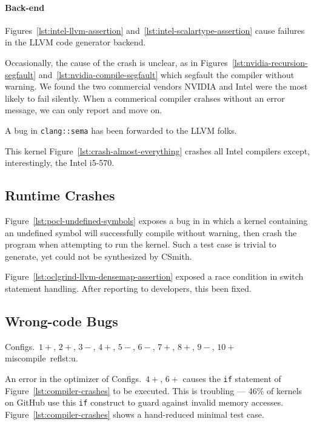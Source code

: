 \paragraph{Back-end} Figures~\ref{lst:intel-llvm-assertion} and~\ref{lst:intel-scalartype-assertion} cause failures in the LLVM code generator backend.

Occasionally, the cause of the crash is unclear, as in Figures~\ref{lst:nvidia-recursion-segfault} and~\ref{lst:nvidia-compile-segfault} which segfault the compiler without warning. We found the two commercial vendors NVIDIA and Intel were the most likely to fail silently. When a commerical compiler crahses without an error message, we can only report and move on.

A bug in \texttt{clang::sema} has been forwarded to the LLVM folks.

This kernel Figure~\ref{lst:crash-almost-everything} crashes all Intel compilers except, interestingly, the Intel i5-570.



\subsection{Runtime Crashes}

Figure~\ref{lst:pocl-undefined-symbols} exposes a bug in in which a kernel containing an undefined symbol will successfully compile without warning, then crash the program when attempting to run the kernel. Such a test case is trivial to generate, yet could not be synthesized by CSmith.

Figure~\ref{lst:oclgrind-llvm-densemap-assertion} exposed a race condition in switch statement handling. After reporting to developers, this been fixed.



\subsection{Wrong-code Bugs}

Configs.\ $1+$, $2+$, $3-$, $4+$, $5-$, $6-$, $7+$, $8+$, $9-$, $10+$ miscompile~ref{lst:u}.

An error in the optimizer of Configs.\ $4+$, $6+$ causes the \texttt{if} statement of Figure~\ref{lst:compiler-crashes} to be executed.
This is troubling --- 46\% of kernels on GitHub use this \texttt{if} construct to guard against invalid memory accesses. Figure~\ref{lst:compiler-crashes} shows a hand-reduced minimal test case.

